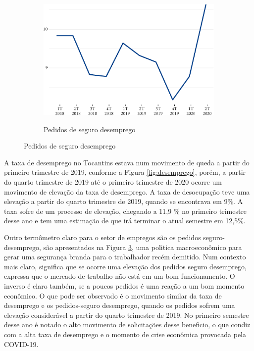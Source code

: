 \begin{figure}[!h]
\begin{subfigure}{\linewidth}
		\notes{\trimestres}
		\label{fig:ocupada}
	\end{subfigure}
	\begin{subfigure}{\linewidth}
		\caption{Pedidos de seguro desemprego}
		\includegraphics{fig/pedido_segudo_desem-1.pdf}
		\notes{\trimestres}
		\label{fig:seguro}
	\end{subfigure}
\end{figure}

\par A taxa de desemprego no Tocantins estava num movimento de queda a partir do primeiro trimestre de 2019, conforme a Figura \ref{fig:desemprego}, porém, a partir do quarto trimestre de 2019 até o primeiro trimestre de 2020 ocorre um movimento de elevação da taxa de desemprego. A taxa de desocupação teve uma elevação a partir do quarto trimestre de 2019, quando se encontrava em 9\%. A taxa sofre de um processo de elevação, chegando a 11,9 \% no primeiro trimestre desse ano e tem uma estimação de que irá terminar o atual semestre em 12,5\%.



\par Outro termômetro claro para o setor de empregos são os pedidos seguro-desemprego, são apresentados na Figura \ref{fig:seguro}, uma politica macroeconômico para gerar uma segurança branda para o trabalhador recém demitido. Num contexto mais claro, significa que se ocorre uma elevação dos pedidos seguro desemprego, expressa que o mercado de trabalho não está em um bom funcionamento. O inverso é claro também, se a poucos pedidos é uma reação a um bom momento econômico. O que pode ser observado é o movimento similar da taxa de desemprego e os pedidos-seguro desemprego, quando os pedidos sofrem uma elevação considerável a partir do quarto trimestre de 2019. No primeiro semestre desse ano é notado o alto movimento de solicitações desse beneficio, o que condiz com a alta taxa de desemprego e o momento de crise econômica provocada pela COVID-19.

